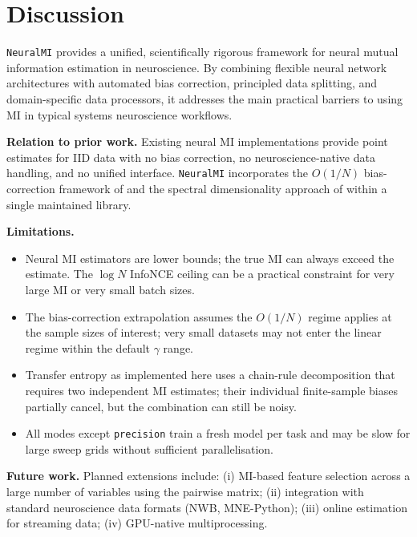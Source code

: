\documentclass[12pt]{article}
\newcommand{\nmi}{\texttt{NeuralMI}}
\newcommand{\api}[1]{\texttt{#1}}
\begin{document}
\section{Discussion}
\label{sec:discussion}

\nmi{} provides a unified, scientifically rigorous framework for neural
mutual information estimation in neuroscience.  By combining flexible
neural network architectures with automated bias correction, principled
data splitting, and domain-specific data processors, it addresses the
main practical barriers to using MI in typical systems neuroscience
workflows.

\textbf{Relation to prior work.}  Existing neural MI implementations
\citep{oord2018representation,song2020understanding,belghazi2018mine}
provide point estimates for IID data with no bias correction, no
neuroscience-native data handling, and no unified interface.  \nmi{}
incorporates the $O(1/N)$ bias-correction framework of
\citet{abdelaleem2025accurate} and the spectral dimensionality approach
of \citet{gulati2026mutual} within a single maintained library.

\textbf{Limitations.}
\begin{itemize}[leftmargin=*]
  \item Neural MI estimators are lower bounds; the true MI can always exceed
        the estimate.  The $\log N$ InfoNCE ceiling can be a practical
        constraint for very large MI or very small batch sizes.
  \item The bias-correction extrapolation assumes the $O(1/N)$ regime
        applies at the sample sizes of interest; very small datasets may not
        enter the linear regime within the default $\gamma$ range.
  \item Transfer entropy as implemented here uses a chain-rule decomposition
        that requires two independent MI estimates; their individual
        finite-sample biases partially cancel, but the combination can
        still be noisy.
  \item All modes except \api{precision} train a fresh model per task and
        may be slow for large sweep grids without sufficient parallelisation.
\end{itemize}

\textbf{Future work.}  Planned extensions include: (i) MI-based feature
selection across a large number of variables using the pairwise matrix;
(ii) integration with standard neuroscience data formats (NWB, MNE-Python);
(iii) online estimation for streaming data; (iv) GPU-native multiprocessing.
\end{document}
